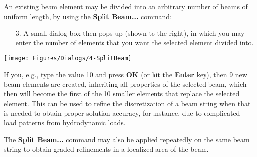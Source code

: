 
\clearpage
{}

An existing beam element may be divided into an arbitrary number of
beams of uniform length, by using the \textbf{Split Beam...} command:

\vskip11mm
\begin{minipage}{0.62\textwidth}
  \raggedright
  \begin{itemize}
  \item[3.]
    A small dialog box then pops up (shown to the right), in which you may enter
    the number of elements that you want the selected element divided into.
  \end{itemize}
\end{minipage}%
\hfill\begin{minipage}{0.35\textwidth}
  \texttt{[image: Figures/Dialogs/4-SplitBeam]}
\end{minipage}

If you, e.g., type the value 10 and press \textbf{OK} (or hit the
\textbf{Enter} key), then 9 new beam elements are created, inheriting
all properties of the selected beam, which then will become the first of
the 10 smaller elements that replace the selected element. This can be
used to refine the discretization of a beam string when that is needed
to obtain proper solution accuracy, for instance, due to complicated
load patterns from hydrodynamic loads.

The \textbf{Split Beam...} command may also be applied repeatedly on the same
beam string to obtain graded refinements in a localized area of the beam.



